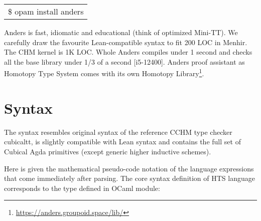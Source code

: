 \documentclass{article}
\begin{document}
\begin{table}[ht]
\centering
\begin{tabular}{l}
\$ opam install anders
\end{tabular}
\end{table}

Anders is fast, idiomatic and educational (think of optimized Mini-TT). We carefully draw the favourite Lean-compatible
syntax to fit 200 LOC in Menhir. The CHM kernel is 1K LOC. Whole Anders compiles under 1
second and checks all the base library under 1/3 of a second [i5-12400]. Anders proof assistant
as Homotopy Type System comes with its own Homotopy Library\footnote{\url{https://anders.groupoid.space/lib/}}.

\section{Syntax}

The syntax resembles original syntax of the reference CCHM type checker cubicaltt,
is slightly compatible with Lean syntax and contains the full set of Cubical Agda \cite{CubicalAgda}
primitives (except generic higher inductive schemes).

Here is given the mathematical pseudo-code notation of the language
expressions that come immediately after parsing. The core syntax definition of HTS language
corresponds to the type defined in OCaml module:
\end{document}

